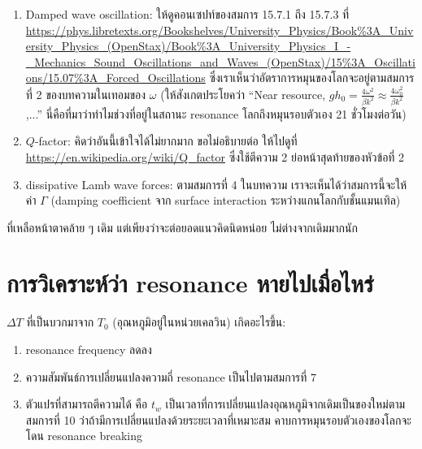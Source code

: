 \documentclass[a4paper, 12pt]{article}
\theoremstyle{plain} %
\begin{document}
\begin{enumerate}
	\item Damped wave oscillation: ให้ดูคอนเซปท์ของสมการ 15.7.1 ถึง 15.7.3 ที่ \url{https://phys.libretexts.org/Bookshelves/University_Physics/Book%3A_University_Physics_(OpenStax)/Book%3A_University_Physics_I_-_Mechanics_Sound_Oscillations_and_Waves_(OpenStax)/15%3A_Oscillations/15.07%3A_Forced_Oscillations} ซึ่งเราเห็นว่าอัตราการหมุนของโลกจะอยู่ตามสมการที่ 2 ของบทความในเทอมของ $\omega$ (ให้สังเกตประโยคว่า ``Near resource, $gh_0 = \frac{4\omega^2}{\beta k^2} \approx \frac{4\omega_0^2}{\beta k^2}$,...'' นี่คือที่มาว่าทำไมช่วงที่อยู่ในสถานะ resonance โลกถึงหมุนรอบตัวเอง 21 ชั่วโมงต่อวัน)
	\item $Q$-factor: คิดว่าอันนี้เข้าใจได้ไม่ยากมาก ขอไม่อธิบายต่อ ให้ไปดูที่ \url{https://en.wikipedia.org/wiki/Q_factor} ซึ่งใช้ตีความ 2 ย่อหน้าสุดท้ายของหัวข้อที่ 2
	\item dissipative Lamb wave forces: ตามสมการที่ 4 ในบทความ เราจะเห็นได้ว่าสมการนี้จะให้ค่า $\Gamma$ (damping coefficient จาก surface interaction ระหว่างแกนโลกกับชั้นแมนเทิล) 
\end{enumerate}

ที่เหลือหน้าตาคล้าย ๆ เดิม แต่เพียงว่าจะต่อยอดแนวคิดนิดหน่อย ไม่ต่างจากเดิมมากนัก

\section{การวิเคราะห์ว่า resonance หายไปเมื่อไหร่}
$\Delta T$ ที่เป็นบวกมาจาก $T_0$ (อุณหภูมิอยู่ในหน่วยเคลวิน) เกิดอะไรขึ้น:
\begin{enumerate}
	\item resonance frequency ลดลง
	\item ความสัมพันธ์การเปลี่ยนแปลงความถี่ resonance เป็นไปตามสมการที่ 7
	\item ตัวแปรที่สามารถตีความได้ คือ $t_w$ เป็นเวลาที่การเปลี่ยนแปลงอุณหภูมิจากเดิมเป็นของใหม่ตามสมการที่ 10 ว่าถ้ามีการเปลี่ยนแปลงด้วยระยะเวลาที่เหมาะสม คาบการหมุนรอบตัวเองของโลกจะโดน resonance breaking
\end{enumerate}
\end{document}
